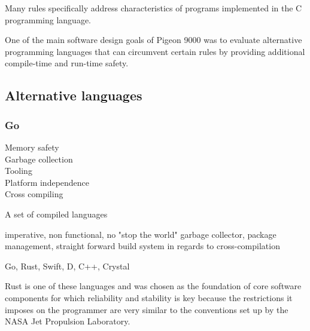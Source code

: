 Many rules specifically address characteristics of programs implemented in the C programming language.

One of the main software design goals of Pigeon 9000 was to evaluate alternative programming languages that can circumvent certain rules by providing additional compile-time and run-time safety.

\subsection{Alternative languages}

\subsubsection{Go}
\begin{description}
\item [Memory safety] 
\item [Garbage collection] 
\item [Tooling]
\item [Platform independence] 
\item [Cross compiling]  
\end{description}

A set of compiled languages 

imperative, non functional, no "stop the world" garbage collector, package management, straight forward build system in regards to cross-compilation

Go, Rust, Swift, D, C++, Crystal







Rust \cite{rust} is one of these languages and was chosen as the foundation of core software components for which reliability and stability is key because the restrictions it imposes on the programmer are very similar to the conventions set up by the NASA Jet Propulsion Laboratory. 
